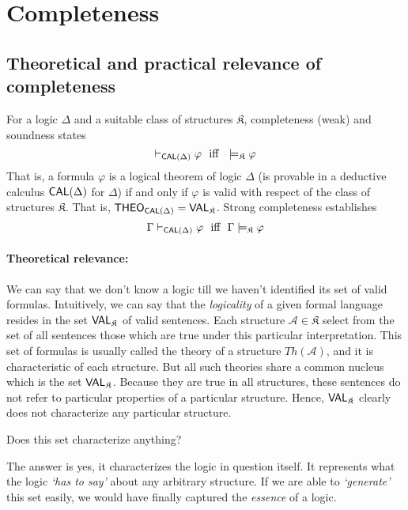 \section{Completeness}\label{completeness}

\subsection{Theoretical and practical relevance of completeness}

For a logic $\Delta$ and a suitable class of structures $\mathfrak{K}$,
completeness (weak) and soundness states%
$$
\vdash _{\CAL(\Delta)}\varphi \ \ \text{iff}\ \ \models _{\mathfrak{K}%
}\varphi
$$
That is, a formula $\varphi $ is a logical theorem of logic $\Delta$ (is
provable in a deductive calculus $\textsf{CAL}(\Delta)$ for $\Delta$) if and only
if $\varphi$ is valid with respect of the class of structures $\mathfrak{K}$. That is, $\textsf{THEO}_{\textsf{CAL}(\Delta)} = \textsf{VAL}_{\mathfrak{K}}$. Strong completeness
establishes 
$$
\Gamma \vdash _{\textsf{CAL}(\Delta)}\varphi \ \ \text{iff}\ \ \Gamma 
\models _{\mathfrak{K}}\varphi
$$

\paragraph{Theoretical relevance:}

We can say that we don't know a logic till we haven't identified its set of
valid formulas. Intuitively, we can say that the \emph{logicality} of a
given formal language resides in the set $\textsf{VAL}_{\mathfrak{K}}$ of valid
sentences. Each structure $\mathcal{A}\in \mathfrak{K}$ select from the set
of all sentences those which are true under this particular interpretation.
This set of formulas is usually called the theory of a structure 
$Th(\mathcal{A})$, and it is characteristic of each structure. But all such
theories share a common nucleus which is the set $\textsf{VAL}_{\mathfrak{K}}$.
Because they are true in all structures, these sentences do not refer to
particular properties of a particular structure. Hence, $\textsf{VAL}_{\mathfrak{K}}$
clearly does not characterize any particular structure.

Does this set characterize anything?

The answer is yes, it characterizes the logic in question itself. It
represents what the logic \emph{`has to say'} about any arbitrary
structure. If we are able to \emph{`generate'} this set easily, we would
have finally captured the \emph{essence} of a logic.

